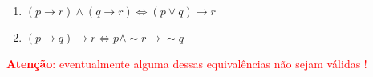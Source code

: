 \documentclass[12pt]{article}
\begin{document}
\begin{enumerate}
\begin{enumerate}


\item  $(p \rightarrow r) \wedge (q \rightarrow r) \Leftrightarrow (p \vee  q) \rightarrow r $ %



\item $(p \rightarrow q) \rightarrow r \Leftrightarrow p \wedge \sim r \rightarrow \sim q$ %


\end{enumerate}

\textcolor{red}{\textbf{Atenção}: eventualmente alguma dessas equivalências não sejam válidas !}





\end{enumerate}
\newpage

\end{document}
